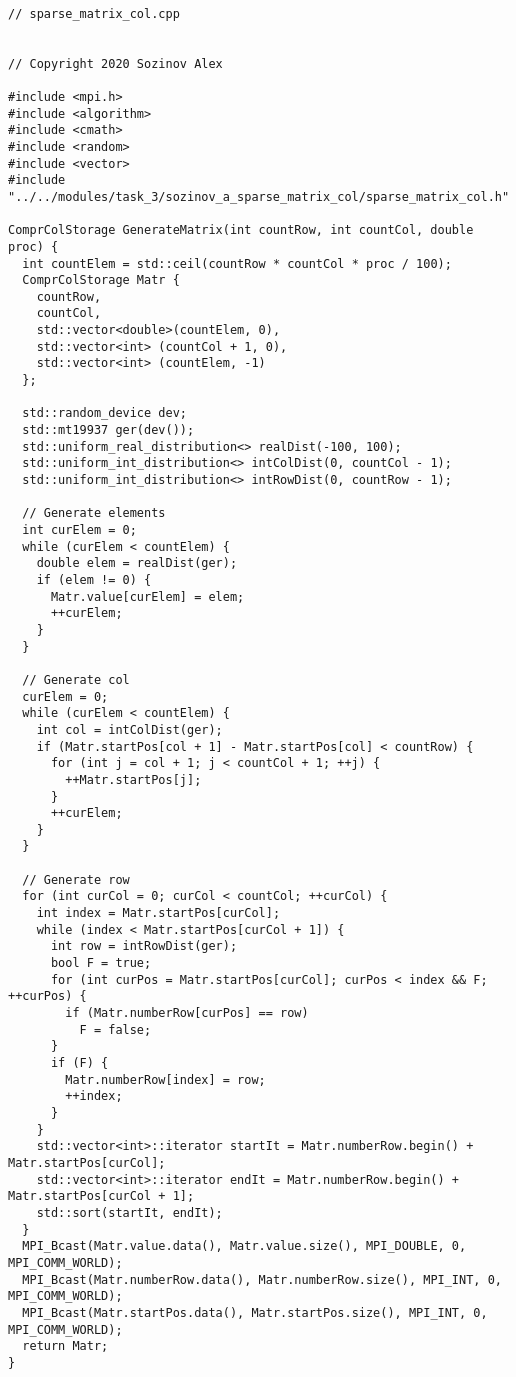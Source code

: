 \documentclass{report}
\begin{document}
\begin{lstlisting}

// sparse_matrix_col.cpp


// Copyright 2020 Sozinov Alex

#include <mpi.h>
#include <algorithm>
#include <cmath>
#include <random>
#include <vector>
#include "../../modules/task_3/sozinov_a_sparse_matrix_col/sparse_matrix_col.h"

ComprColStorage GenerateMatrix(int countRow, int countCol, double proc) {
  int countElem = std::ceil(countRow * countCol * proc / 100);
  ComprColStorage Matr {
    countRow,
    countCol,
    std::vector<double>(countElem, 0),
    std::vector<int> (countCol + 1, 0),
    std::vector<int> (countElem, -1)
  };

  std::random_device dev;
  std::mt19937 ger(dev());
  std::uniform_real_distribution<> realDist(-100, 100);
  std::uniform_int_distribution<> intColDist(0, countCol - 1);
  std::uniform_int_distribution<> intRowDist(0, countRow - 1);

  // Generate elements
  int curElem = 0;
  while (curElem < countElem) {
    double elem = realDist(ger);
    if (elem != 0) {
      Matr.value[curElem] = elem;
      ++curElem;
    }
  }

  // Generate col
  curElem = 0;
  while (curElem < countElem) {
    int col = intColDist(ger);
    if (Matr.startPos[col + 1] - Matr.startPos[col] < countRow) {
      for (int j = col + 1; j < countCol + 1; ++j) {
        ++Matr.startPos[j];
      }
      ++curElem;
    }
  }

  // Generate row
  for (int curCol = 0; curCol < countCol; ++curCol) {
    int index = Matr.startPos[curCol];
    while (index < Matr.startPos[curCol + 1]) {
      int row = intRowDist(ger);
      bool F = true;
      for (int curPos = Matr.startPos[curCol]; curPos < index && F; ++curPos) {
        if (Matr.numberRow[curPos] == row)
          F = false;
      }
      if (F) {
        Matr.numberRow[index] = row;
        ++index;
      }
    }
    std::vector<int>::iterator startIt = Matr.numberRow.begin() + Matr.startPos[curCol];
    std::vector<int>::iterator endIt = Matr.numberRow.begin() + Matr.startPos[curCol + 1];
    std::sort(startIt, endIt);
  }
  MPI_Bcast(Matr.value.data(), Matr.value.size(), MPI_DOUBLE, 0, MPI_COMM_WORLD);
  MPI_Bcast(Matr.numberRow.data(), Matr.numberRow.size(), MPI_INT, 0, MPI_COMM_WORLD);
  MPI_Bcast(Matr.startPos.data(), Matr.startPos.size(), MPI_INT, 0, MPI_COMM_WORLD);
  return Matr;
}


\end{lstlisting}
\end{document}
